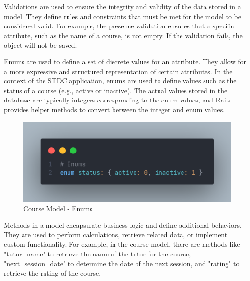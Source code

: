 \begin{justify}
        \vspace{0.25cm}
        \newendline Validations are used to ensure the integrity and validity of the data stored in a model. They define rules and constraints that must be met for the model to be considered valid. For example, the presence validation ensures that a specific attribute, such as the name of a course, is not empty. If the validation fails, the object will not be saved.
        
        \vspace{0.25cm}
        \newendline Enums are used to define a set of discrete values for an attribute. They allow for a more expressive and structured representation of certain attributes. In the context of the STDC application, enums are used to define values such as the status of a course (e.g., active or inactive). The actual values stored in the database are typically integers corresponding to the enum values, and Rails provides helper methods to convert between the integer and enum values.

        \begin{figure}[H]
            \centerline{\includegraphics[width=115mm,scale=1]{figures/implementation_and_testing/implementation/backend/course_enums.png}}
            \caption{Course Model - Enums}
        \end{figure}

        
        \vspace{0.25cm}
        \newendline Methods in a model encapsulate business logic and define additional behaviors. They are used to perform calculations, retrieve related data, or implement custom functionality. For example, in the course model, there are methods like "tutor\_name" to retrieve the name of the tutor for the course, "next\_session\_date" to determine the date of the next session, and "rating" to retrieve the rating of the course.


\end{justify}
